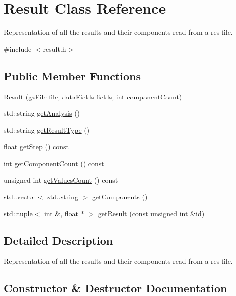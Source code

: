 \hypertarget{classResult}{}\section{Result Class Reference}
\label{classResult}


Representation of all the results and their components read from a res file.  




{\ttfamily \#include $<$result.\+h$>$}

\subsection*{Public Member Functions}
\begin{DoxyCompactItemize}
\item 
\hyperlink{classResult_aebbe4a0e66acff6edd381f2a6c7c46df}{Result} (gz\+File file, \hyperlink{utilities_8h_a981a882ef2a0d7ee5b6b32f27105644e}{data\+Fields} fields, int component\+Count)
\item 
std\+::string \hyperlink{classResult_ae9109a2e288a93e1c08d1e495f59191f}{get\+Analysis} ()
\item 
std\+::string \hyperlink{classResult_ad7d2789c7ec7187c67ef1541bd59f214}{get\+Result\+Type} ()
\item 
float \hyperlink{classResult_ae152b587e08f50380c6fc0a54faa08c5}{get\+Step} () const
\item 
int \hyperlink{classResult_a3385ff986211d42ed68d917f365413b9}{get\+Component\+Count} () const
\item 
unsigned int \hyperlink{classResult_a13c7c3058d5d8e2b52a31091061199d3}{get\+Values\+Count} () const
\item 
std\+::vector$<$ std\+::string $>$ \hyperlink{classResult_a20f951753ffd91535a66ec365e2256ff}{get\+Components} ()
\item 
std\+::tuple$<$ int \&, float $\ast$ $>$ \hyperlink{classResult_a987118e44f4275e394a27519fa9c70b1}{get\+Result} (const unsigned int \&id)
\end{DoxyCompactItemize}


\subsection{Detailed Description}
Representation of all the results and their components read from a res file. 

\subsection{Constructor \& Destructor Documentation}
\mbox{\label{classResult_aebbe4a0e66acff6edd381f2a6c7c46df}} 
